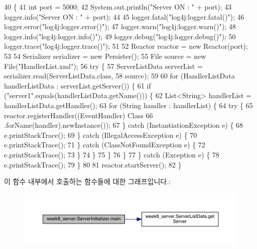 \begin{DoxyCode}
40                                            \{
41         \textcolor{keywordtype}{int} port = 5000;
42         System.out.println(\textcolor{stringliteral}{"Server ON : "} + port);
43         logger.info(\textcolor{stringliteral}{"Server ON : "} + port);
44 
45         logger.fatal(\textcolor{stringliteral}{"log4j:logger.fatal()"});
46         logger.error(\textcolor{stringliteral}{"log4j:logger.error()"});
47         logger.warn(\textcolor{stringliteral}{"log4j:logger.warn()"});
48         logger.info(\textcolor{stringliteral}{"log4j:logger.info()"});
49         logger.debug(\textcolor{stringliteral}{"log4j:logger.debug()"});
50         logger.trace(\textcolor{stringliteral}{"log4j:logger.trace()"});
51 
52         Reactor reactor = \textcolor{keyword}{new} Reactor(port);
53 
54         Serializer serializer = \textcolor{keyword}{new} Persister();
55         File source = \textcolor{keyword}{new} File(\textcolor{stringliteral}{"HandlerList.xml"});
56         \textcolor{keywordflow}{try} \{
57             ServerListData serverList = serializer.read(ServerListData.class,
58                     source);
59 
60             \textcolor{keywordflow}{for} (HandlerListData handlerListData : serverList.getServer()) \{
61                 \textcolor{keywordflow}{if} (\textcolor{stringliteral}{"server1"}.equals(handlerListData.getName())) \{
62                     List<String> handlerList = handlerListData.getHandler();
63                     \textcolor{keywordflow}{for} (String handler : handlerList) \{
64                         \textcolor{keywordflow}{try} \{
65                             reactor.registerHandler((EventHandler) Class
66                                     .forName(handler).newInstance());
67                         \} \textcolor{keywordflow}{catch} (InstantiationException e) \{
68                             e.printStackTrace();
69                         \} \textcolor{keywordflow}{catch} (IllegalAccessException e) \{
70                             e.printStackTrace();
71                         \} \textcolor{keywordflow}{catch} (ClassNotFoundException e) \{
72                             e.printStackTrace();
73                         \}
74                     \}
75                 \}
76             \}
77         \} \textcolor{keywordflow}{catch} (Exception e) \{
78             e.printStackTrace();
79         \}
80 
81         reactor.startServer();
82     \}
\end{DoxyCode}


이 함수 내부에서 호출하는 함수들에 대한 그래프입니다.\-:
\nopagebreak
\begin{figure}[H]
\begin{center}
\leavevmode
\includegraphics[width=350pt]{classweek8__server_1_1_server_initializer_a73b9694a5855a87335cbe63c96f8c8a9_cgraph}
\end{center}
\end{figure}




